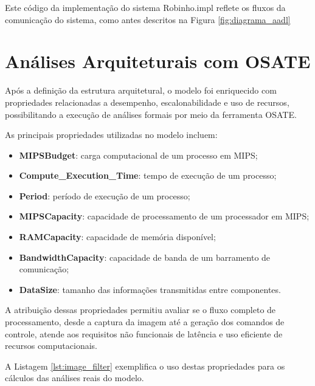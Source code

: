 Este código da implementação do sistema Robinho.impl reflete os fluxos da comunicação do sistema, como antes descritos na Figura \ref{fig:diagrama_aadl}

\section{Análises Arquiteturais com OSATE}

Após a definição da estrutura arquitetural, o modelo foi enriquecido com propriedades relacionadas a desempenho, escalonabilidade e uso de recursos, possibilitando a execução de análises formais por meio da ferramenta OSATE.

As principais propriedades utilizadas no modelo incluem:

\begin{itemize}
    \item \textbf{MIPSBudget}: carga computacional de um processo em MIPS;
    \item \textbf{Compute\_Execution\_Time}: tempo de execução de um processo;
    \item \textbf{Period}: período de execução de um processo;
    \item \textbf{MIPSCapacity}: capacidade de processamento de um processador em MIPS;
    \item \textbf{RAMCapacity}: capacidade de memória disponível;
    \item \textbf{BandwidthCapacity}: capacidade de banda de um barramento de comunicação;
    \item \textbf{DataSize}: tamanho das informações transmitidas entre componentes.
\end{itemize}

A atribuição dessas propriedades permitiu avaliar se o fluxo completo de processamento, desde a captura da imagem até a geração dos comandos de controle, atende aos requisitos não funcionais de latência e uso eficiente de recursos computacionais.

A Listagem \ref{lst:image_filter} exemplifica o uso destas propriedades para os cálculos das análises reais do modelo.

